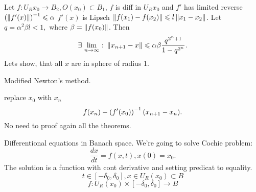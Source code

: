 

\theorem{} Let $f\colon U_R{x_0}\to B_2, O(x_0)\subset B_1$, $f$ is diff in $U_R{x_0}$ and $f'$ has limited reverse $\left(\left\|{f'(x)}\right\|\right)^{-1} \leqslant \alpha$
$f'(x)$ is Lipsch $\left\|{f(x_1) - f(x_2)}\right\| \leqslant l\left\|{x_1-x_2}\right\|$. Let $q = \alpha^2\beta l < 1,$ where $\beta = \left\|{f(x_0)}\right\|$. Then 
$$\exists\,\lim_{n\to\infty}\:\colon \left\|{x_{n+1} - x}\right\| \leqslant \alpha\beta\frac{q^{2^n+1}}{1-q^{2^n}}.$$
Lets show, that all $x$ are in sphere of radius 1.

Modified Newton's method.

replace $x_0$ with $x_n$
$$f(x_n) - \left(f'(x_0)\right)^{-1}(x_{n+1} - x_n).$$
No need to proof again all the theorems.


Differentional equations in Banach space.
We're going to solve Cochie problem:
$$\frac{dx}{dt} = f(x,t), x(0) = x_0.$$
The solution is a function with cont derivative and setting predicat to equality.
$$t\in [-\delta_0, \delta_0], x\in U_R(x_0)\subset B$$
$$f\colon U_R(x_0)\times[-\delta_0, \delta_0] \to B$$

